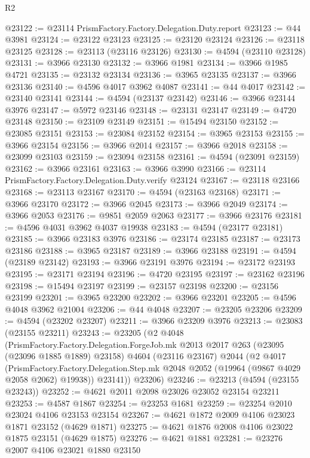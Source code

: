 \begin{lexlean}{R2}
\begin{coremodule}
@23122 := @23114 PrismFactory.Factory.Delegation.Duty.report
@23123 := @44 @3981
@23124 := @23122 @23123
@23125 := @23120 @23124
@23126 := @23118 @23125
@23128 := @23113 (@23116 @23126)
@23130 := @4594 (@23110 @23128)
@23131 := @3966 @23130
@23132 := @3966 @1981
@23134 := @3966 @1985 @4721
@23135 := @23132 @23134
@23136 := @3965 @23135
@23137 := @3966 @23136
@23140 := @4596 @4017 @3962 @4087
@23141 := @44 @4017
@23142 := @23140 @23141
@23144 := @4594 (@23137 @23142)
@23146 := @3966 @23144 @3976
@23147 := @5972 @23146
@23148 := @23131 @23147
@23149 := @4720 @23148
@23150 := @23109 @23149
@23151 := @15494 @23150
@23152 := @23085 @23151
@23153 := @23084 @23152
@23154 := @3965 @23153
@23155 := @3966 @23154
@23156 := @3966 @2014
@23157 := @3966 @2018
@23158 := @23099 @23103
@23159 := @23094 @23158
@23161 := @4594 (@23091 @23159)
@23162 := @3966 @23161
@23163 := @3966 @3990
@23166 := @23114 PrismFactory.Factory.Delegation.Duty.verify @23124
@23167 := @23118 @23166
@23168 := @23113 @23167
@23170 := @4594 (@23163 @23168)
@23171 := @3966 @23170
@23172 := @3966 @2045
@23173 := @3966 @2049
@23174 := @3966 @2053
@23176 := @9851 @2059 @2063
@23177 := @3966 @23176
@23181 := @4596 @4031 @3962 @4037 @19938
@23183 := @4594 (@23177 @23181)
@23185 := @3966 @23183 @3976
@23186 := @23174 @23185
@23187 := @23173 @23186
@23188 := @3965 @23187
@23189 := @3966 @23188
@23191 := @4594 (@23189 @23142)
@23193 := @3966 @23191 @3976
@23194 := @23172 @23193
@23195 := @23171 @23194
@23196 := @4720 @23195
@23197 := @23162 @23196
@23198 := @15494 @23197
@23199 := @23157 @23198
@23200 := @23156 @23199
@23201 := @3965 @23200
@23202 := @3966 @23201
@23205 := @4596 @4048 @3962 @21004
@23206 := @44 @4048
@23207 := @23205 @23206
@23209 := @4594 (@23202 @23207)
@23211 := @3966 @23209 @3976
@23213 := @23083 (@23155 @23211)
@23243 := @23205
    (@2
      @4048
      (PrismFactory.Factory.Delegation.ForgeJob.mk
        @2013
        @2017
        @263
        (@23095 (@23096 @1885 @1889) @23158)
        @4604
        (@23116 @23167)
        @2044
        (@2
          @4017
          (PrismFactory.Factory.Delegation.Step.mk
            @2048
            @2052
            (@19964 (@9867 @4029 @2058 @2062) @19938))
          @23141))
      @23206)
@23246 := @23213 (@4594 (@23155 @23243))
@23252 := @4621 @2011 @2098 @23026 @23052 @23154 @23211
@23253 := @4587 @1867
@23254 := @23253 @1681
@23259 := @23254 @2010 @23024 @4106 @23153 @23154
@23267 := @4621 @1872 @2009 @4106 @23023 @1871 @23152 (@4629 @1871)
@23275 := @4621 @1876 @2008 @4106 @23022 @1875 @23151 (@4629 @1875)
@23276 := @4621 @1881
@23281 := @23276 @2007 @4106 @23021 @1880 @23150

\end{coremodule}
\end{lexlean}
